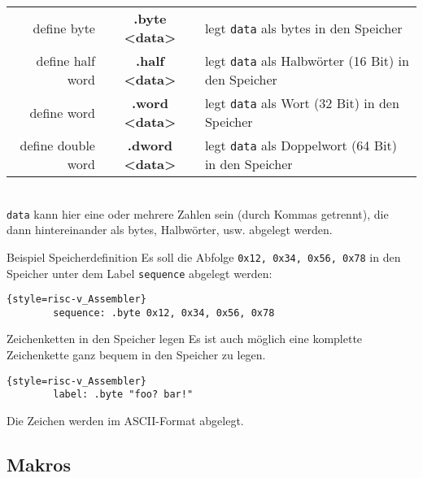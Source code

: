 {\begin{centering}
	\begin{tabular}{rcl}
		define byte & \textbf{.byte <data>} & legt \texttt{data} als bytes in den Speicher\\
		define half word & \textbf{.half <data>} & legt \texttt{data} als Halbwörter (16 Bit) in den Speicher\\
		define word & \textbf{.word <data>} & legt \texttt{data} als Wort (32 Bit) in den Speicher\\
		define double word & \textbf{.dword <data>} & legt \texttt{data} als Doppelwort (64 Bit) in den Speicher\\
	\end{tabular}
\end{centering}
\\
\texttt{data} kann hier eine oder mehrere Zahlen sein (durch Kommas getrennt), die dann hintereinander als bytes, Halbwörter, usw. abgelegt werden.
\begin{exampleblock}{Beispiel Speicherdefinition}
	Es soll die Abfolge \texttt{0x12, 0x34, 0x56, 0x78} in den Speicher unter dem Label \texttt{sequence} abgelegt werden:
	\begin{lstlisting}{style=risc-v_Assembler}
		sequence: .byte 0x12, 0x34, 0x56, 0x78
	\end{lstlisting}
\end{exampleblock}
\begin{infoblock}{Zeichenketten in den Speicher legen}
	Es ist auch möglich eine komplette Zeichenkette ganz bequem in den Speicher zu legen.
	\begin{lstlisting}{style=risc-v_Assembler}
		label: .byte "foo? bar!"
	\end{lstlisting}
	Die Zeichen werden im ASCII-Format abgelegt.
\end{infoblock}

\subsection{Makros}

}

